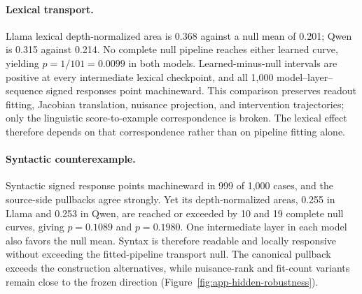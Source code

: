 \paragraph{Lexical transport.} Llama lexical depth-normalized area is 0.368 against a null mean of 0.201; Qwen is 0.315 against 0.214. No complete null pipeline reaches either learned curve, yielding \(p=1/101=0.0099\) in both models. Learned-minus-null intervals are positive at every intermediate lexical checkpoint, and all 1,000 model--layer--sequence signed responses point machineward. This comparison preserves readout fitting, Jacobian translation, nuisance projection, and intervention trajectories; only the linguistic score-to-example correspondence is broken. The lexical effect therefore depends on that correspondence rather than on pipeline fitting alone.

\paragraph{Syntactic counterexample.} Syntactic signed response points machineward in 999 of 1,000 cases, and the source-side pullbacks agree strongly. Yet its depth-normalized areas, 0.255 in Llama and 0.253 in Qwen, are reached or exceeded by 10 and 19 complete null curves, giving \(p=0.1089\) and \(p=0.1980\). One intermediate layer in each model also favors the null mean. Syntax is therefore readable and locally responsive without exceeding the fitted-pipeline transport null. The canonical pullback exceeds the construction alternatives, while nuisance-rank and fit-count variants remain close to the frozen direction (Figure~\ref{fig:app-hidden-robustness}).

